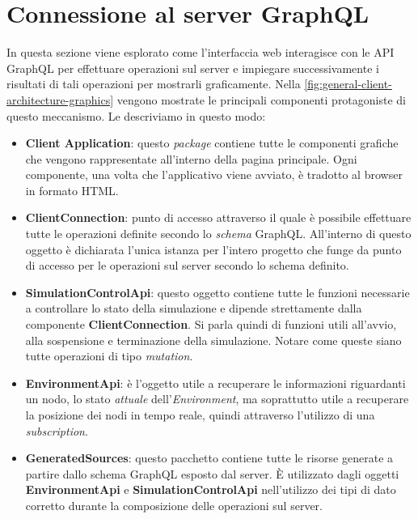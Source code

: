 \section{Connessione al server GraphQL}\label{section:graphql-connection}
In questa sezione viene esplorato come l'interfaccia web interagisce con le \ac{API} GraphQL per effettuare operazioni sul server e impiegare successivamente i risultati di tali operazioni per mostrarli graficamente. Nella \cref{fig:general-client-architecture-graphics} vengono mostrate le principali componenti protagoniste di questo meccanismo. Le descriviamo in questo modo:

\begin{itemize}
	\item \textbf{Client Application}: questo \textit{package} contiene tutte le componenti grafiche che vengono rappresentate all'interno della pagina principale. Ogni componente, una volta che l'applicativo viene avviato, è tradotto al browser in formato HTML.
	\item \textbf{ClientConnection}: punto di accesso attraverso il quale è possibile effettuare tutte le operazioni definite secondo lo \textit{schema} GraphQL. All'interno di questo oggetto è dichiarata l'unica istanza per l'intero progetto che funge da punto di accesso per le operazioni sul server secondo lo schema definito. 
	\item \textbf{SimulationControlApi}: questo oggetto contiene tutte le funzioni necessarie a controllare lo stato della simulazione e dipende strettamente dalla componente \textbf{ClientConnection}. Si parla quindi di funzioni utili all'avvio, alla sospensione e terminazione della simulazione. Notare come queste siano tutte operazioni di tipo \textit{mutation}.
	\item \textbf{EnvironmentApi}: è l'oggetto utile a recuperare le informazioni riguardanti un nodo, lo stato \textit{attuale} dell'\textit{Environment}, ma soprattutto utile a recuperare la posizione dei nodi in tempo reale, quindi attraverso l'utilizzo di una \textit{subscription}. 
	\item \textbf{GeneratedSources}\label{item:generated-sources}: questo pacchetto contiene tutte le risorse generate a partire dallo schema GraphQL esposto dal server. È utilizzato dagli oggetti \textbf{EnvironmentApi} e \textbf{SimulationControlApi} nell'utilizzo dei tipi di dato corretto durante la composizione delle operazioni sul server.
\end{itemize}

